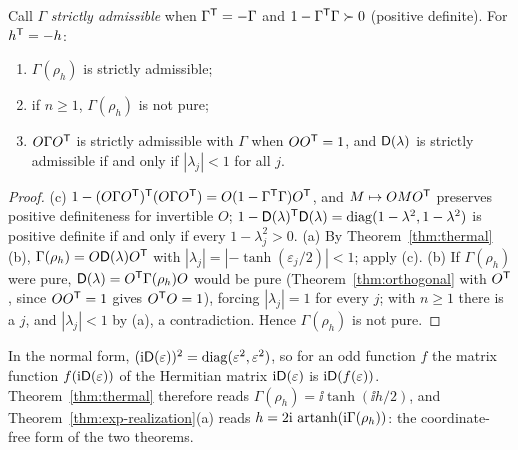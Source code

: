 \begin{proposition}\label{prop:strict}
Call $\Gamma$ \emph{strictly admissible} when $\Gamma^{\mathsf T}=-\Gamma$ and $1-\Gamma^{\mathsf T}\Gamma\succ0$
(positive definite). For $h^{\mathsf T}=-h$:
\begin{enumerate}
\item[(a)] $\Gamma(\rho_h)$ is strictly admissible;
\item[(b)] if $n\geq1$, $\Gamma(\rho_h)$ is not pure;
\item[(c)] $O\Gamma O^{\mathsf T}$ is strictly admissible with $\Gamma$ when $OO^{\mathsf T}=1$, and
$\mathsf D(\lambda)$ is strictly admissible if and only if $|\lambda_j|<1$ for all $j$.
\end{enumerate}
\end{proposition}
\begin{proof}
(c) $1-(O\Gamma O^{\mathsf T})^{\mathsf T}(O\Gamma O^{\mathsf T})=O(1-\Gamma^{\mathsf T}\Gamma)O^{\mathsf T}$, and $M\mapsto OMO^{\mathsf T}$
preserves positive definiteness for invertible $O$;
$1-\mathsf D(\lambda)^{\mathsf T}\mathsf D(\lambda)=\operatorname{diag}(1-\lambda^2,1-\lambda^2)$ is positive definite
if and only if every $1-\lambda_j^2>0$. (a) By Theorem~\ref{thm:thermal}(b),
$\Gamma(\rho_h)=O\mathsf D(\lambda)O^{\mathsf T}$ with $|\lambda_j|=|{-\tanh(\varepsilon_j/2)}|<1$; apply (c).
(b) If $\Gamma(\rho_h)$ were pure, $\mathsf D(\lambda)=O^{\mathsf T}\Gamma(\rho_h)O$ would be pure
(Theorem~\ref{thm:orthogonal} with $O^{\mathsf T}$, since $OO^{\mathsf T}=1$ gives $O^{\mathsf T}O=1$), forcing
$|\lambda_j|=1$ for every $j$; with $n\geq1$ there is a $j$, and $|\lambda_j|<1$ by (a), a
contradiction. Hence $\Gamma(\rho_h)$ is not pure.
\end{proof}
\begin{remark}\label{rem:coordinate-free}
In the normal form, $(\mathrm i\mathsf D(\varepsilon))^2=\operatorname{diag}(\varepsilon^2,\varepsilon^2)$,
so for an odd function $f$ the matrix function $f(\mathrm i\mathsf D(\varepsilon))$ of the Hermitian matrix
$\mathrm i\mathsf D(\varepsilon)$ is $\mathrm i\mathsf D(f(\varepsilon))$. Theorem~\ref{thm:thermal} therefore reads
$\Gamma(\rho_h)=\ii\tanh(\ii h/2)$, and Theorem~\ref{thm:exp-realization}(a) reads
$h=2\mathrm i\,\operatorname{artanh}(\mathrm i\Gamma(\rho_h))$: the coordinate-free form of the two theorems.
\end{remark}

